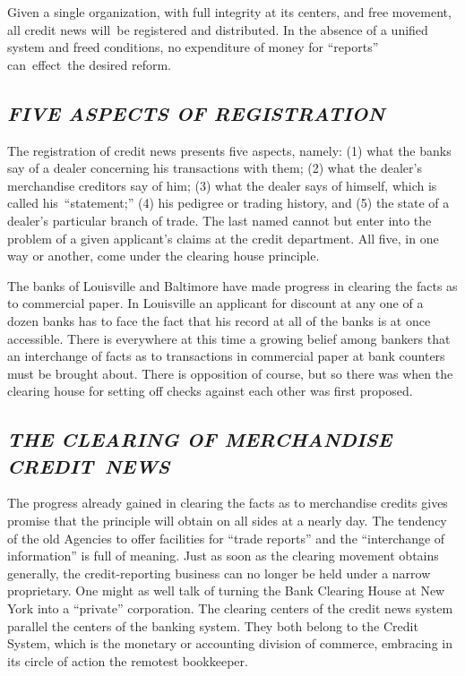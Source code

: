 \documentclass[twoside,symmetric,nobib,justified]{tufte-book}
\begin{document}
Given a single organization, with full integrity at its centers, and
free movement, all credit news will~be registered and distributed. In
the absence of a unified system and freed conditions, no expenditure of
money for ``reports'' can~effect~the desired reform.~

\hypertarget{five-aspects-of-registration}{%
\subsection{\texorpdfstring{\emph{FIVE ASPECTS OF
REGISTRATION}}{FIVE ASPECTS OF REGISTRATION}}\label{five-aspects-of-registration}}

The registration of credit news presents five aspects, namely: (1) what
the banks say of a dealer concerning his transactions with them; (2)
what the dealer's merchandise creditors say of him; (3) what the dealer
says of himself, which is called his~``statement;'' (4) his pedigree or
trading history, and (5) the state of a dealer's particular branch of
trade. The last named cannot but enter into the problem of a given
applicant's claims at the credit department. All five, in one way or
another, come under the clearing house principle.~

The banks of Louisville and Baltimore have made progress in clearing the
facts as to commercial paper. In Louisville an applicant for discount at
any one of a dozen banks has to face the fact that his record at all of
the banks is at once accessible. There is everywhere at this time a
growing belief among bankers that an interchange of facts as to
transactions in commercial paper at bank counters must be brought about.
There is opposition of course, but so there was when the clearing house
for setting off checks against each other was first proposed.~

\hypertarget{the-clearing-of-merchandise-credit-news}{%
\subsection{\texorpdfstring{\emph{THE CLEARING OF MERCHANDISE
CREDIT~NEWS}}{THE CLEARING OF MERCHANDISE CREDIT~NEWS}}\label{the-clearing-of-merchandise-credit-news}}

The progress already gained in clearing the facts as to merchandise
credits gives promise that the principle will obtain on all sides at a
nearly day. The tendency of the old Agencies to offer facilities for
``trade reports'' and the ``interchange of information'' is full of
meaning. Just as soon as the clearing movement obtains generally, the
credit-reporting business can no longer be held under a narrow
proprietary. One might as well talk of turning the Bank Clearing House
at New York into a ``private'' corporation. The clearing centers of the
credit news system parallel the centers of the banking system. They both
belong to the Credit System, which is the monetary or accounting
division of commerce, embracing in its circle of action the remotest
bookkeeper.~
\end{document}
